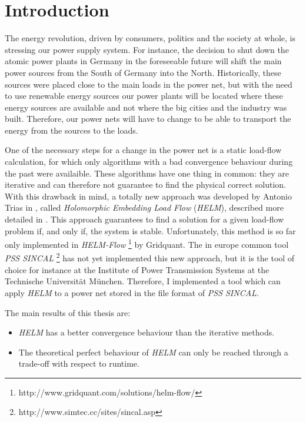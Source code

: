 \chapter{Introduction}
The energy revolution, driven by consumers, politics and the society at whole, is stressing our power supply system. For instance, the decision to shut down the atomic power plants in Germany in the foreseeable future will shift the main power sources from the South of Germany into the North. Historically, these sources were placed close to the main loads in the power net, but with the need to use renewable energy sources our power plants will be located where these energy sources are available and not where the big cities and the industry was built. Therefore, our power nets will have to change to be able to transport the energy from the sources to the loads.

One of the necessary steps for a change in the power net is a static load-flow calculation, for which only algorithms with a bad convergence behaviour during the past were availaible. These algorithms have one thing in common: they are iterative and can therefore not guarantee to find the physical correct solution. With this drawback in mind, a totally new approach was developed by Antonio Trias in \citep{helmIEEE}, called \emph{Holomorphic Embedding Load Flow} (\emph{HELM}), described more detailed in . This approach guarantees to find a solution for a given load-flow problem if, and only if, the system is stable. Unfortunately, this method is so far only implemented in \emph{HELM-Flow} \footnote{http://www.gridquant.com/solutions/helm-flow/} by Gridquant. The in europe common tool \emph{PSS SINCAL} \footnote{http://www.simtec.cc/sites/sincal.asp} has not yet implemented this new approach, but it is the tool of choice for instance at the Institute of Power Transmission Systems at the Technische Universität München. Therefore, I implemented a tool which can apply \emph{HELM} to a power net stored in the file format of \emph{PSS SINCAL}.

The main results of this thesis are:
\begin{itemize}
	\item \emph{HELM} has a better convergence behaviour than the iterative methods.
	\item The theoretical perfect behaviour of \emph{HELM} can only be reached through a trade-off with respect to runtime.
\end{itemize}